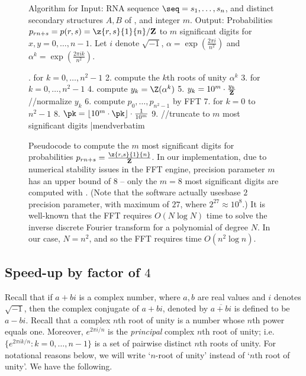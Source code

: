 \begin{figure}[!ht]
\begin{small}
{\sc Algorithm} for \ffttwo\hfill\break
{\sc Input:} RNA sequence $\seq=s_1,\ldots,s_n$, and distinct secondary
structures $A,B$ of \seq, and integer $m$. \hfill\break
{\sc Output:} Probabilities $p_{rn+s} = p(r,s)=\z{r,s}{1}{n}/{\bf Z}$
to $m$ significant digits for $x,y=0,\ldots,n-1$.
Let $i$ denote $\sqrt{-1}$, $\alpha = \exp(\frac{2\pi i}{n^2})$ and
$\alpha^k = \exp(\frac{2\pi i k}{n^2})$.
\end{small}
\hfill\break
\smallskip
\begin{small}
.  for $k=0,\ldots,n^2-1$
 2.    compute the $k$th roots of unity $\alpha^k$
 3.  for $k=0,\ldots,n^2-1$
 4.    compute $y_k = \Z(\alpha^k)$
 5.    $y_k = 10^m \cdot \frac{y_k}{{\bf Z}}$ //normalize $y_k$
 6.  compute $p_0,\ldots,p_{n^2-1}$ by FFT
 7.  for $k=0$ to $n^2-1$
 8.    $\pk = \lfloor 10^m \cdot \pk \rfloor \cdot \frac{1}{10^m}$
 9.  //truncate to $m$ most significant digits
|mendverbatim
\end{small}
\caption{\small
Pseudocode to compute the $m$ most significant digits
for probabilities
$p_{rn+s} = \frac{\z{r,s}{1}{n}}{{\bf Z}}$. In our implementation,
due to numerical stability issues in the FFT engine, precision parameter
$m$ has an upper bound of $8$ -- only the $m=8$ most significant digits
are computed with \ffttwo.
(Note that the software actually usesbase $2$ precision parameter, with maximum of $27$, where $2^{27} \approx
10^8$.)
It is well-known that
the FFT requires $O(N \log N)$ time to solve the inverse discrete
Fourier transform for a polynomial of degree $N$. In our case,
$N=n^2$, and so the FFT requires time $O(n^2 \log n)$.
}
\label{fig:fftbor}
\end{figure}


\subsection{Speed-up by factor of $4$}
Recall that if $a+bi$ is a complex number, where $a,b$ are real values and $i$
denotes $\sqrt{-1}$, then the complex conjugate of $a+bi$, denoted by
$\overline{a+bi}$ is defined to be $a-bi$.  Recall that a complex $n$th
root of unity is a number whose $n$th power equals one. Moreover,
$e^{2 \pi i/n}$ is the {\em principal} complex $n$th root of unity; i.e.
$\{ e^{2 \pi i k/n} : k=0,\ldots,n-1 \}$ is a set of pairwise distinct
$n$th roots of unity. For notational reasons below, we will write
`$n$-root of unity' instead of `$n$th root of unity'.
We have the following.
\medskip

